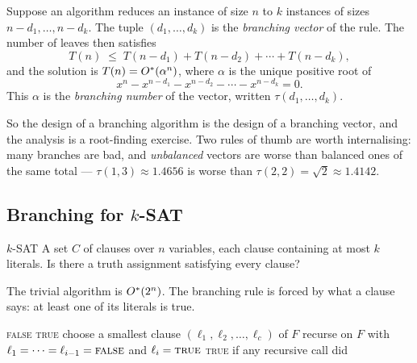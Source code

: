 \begin{definition}\label{def:branching-vector}
Suppose an algorithm reduces an instance of size $n$ to $k$ instances of sizes
$n - d_1, \ldots, n - d_k$. The tuple $(d_1,\ldots,d_k)$ is the \emph{branching
vector} of the rule. The number of leaves then satisfies
\[ T(n) \;\le\; T(n-d_1) + T(n-d_2) + \cdots + T(n-d_k), \]
and the solution is $T(n) = O^{*}(\alpha^n)$, where $\alpha$ is the unique
positive root of
\[ x^{n} - x^{n-d_1} - x^{n-d_2} - \cdots - x^{n-d_k} = 0 . \]
This $\alpha$ is the \emph{branching number} of the vector, written
$\tau(d_1,\ldots,d_k)$.
\end{definition}

So the design of a branching algorithm is the design of a branching vector, and
the analysis is a root-finding exercise. Two rules of thumb are worth
internalising: many branches are bad, and \emph{unbalanced} vectors are worse
than balanced ones of the same total --- $\tau(1,3) \approx 1.4656$ is worse
than $\tau(2,2) = \sqrt2 \approx 1.4142$.

\subsection{Branching for \texorpdfstring{$k$}{k}-SAT}

\begin{probdef}{$k$-SAT}
  \instance A set $C$ of clauses over $n$ variables, each clause containing at
  most $k$ literals.
  \question Is there a truth assignment satisfying every clause?
\end{probdef}

The trivial algorithm is $O^{*}(2^n)$. The branching rule is forced by what a
clause says: at least one of its literals is true.

\begin{algorithm}[ht]
\caption{Branching for $k$-SAT}
\label{alg:exact-ksat}
\begin{algorithmic}[1]
     \Return \textsc{false} \EndIf
     \Return \textsc{true} \EndIf
    \State choose a smallest clause $(\ell_1, \ell_2, \ldots, \ell_c)$ of $F$
      \State recurse on $F$ with
             $\ell_1 = \cdots = \ell_{i-1} = \textsc{false}$ and
             $\ell_i = \textsc{true}$
    \EndFor
    \State \Return \textsc{true} if any recursive call did
  \EndFunction
\end{algorithmic}
\end{algorithm}


